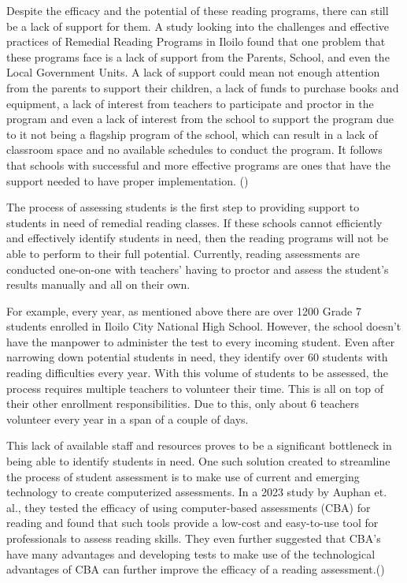 Despite the efficacy and the potential of these reading programs, there can still be a lack of support for them. A study looking into the challenges and effective practices of Remedial Reading Programs in Iloilo found that one problem that these programs face is a lack of support from the Parents, School, and even the Local Government Units. A lack of support could mean not enough attention from the parents to support their children, a lack of funds to purchase books and equipment, a lack of interest from teachers to participate and proctor in the program and even a lack of interest from the school to support the program due to it not being a flagship program of the school, which can result in a lack of classroom space and no available schedules to conduct the program. It follows that schools with successful and more effective programs are ones that have the support needed to have proper implementation. (\cite{Sancada_2022})

The process of assessing students is the first step to providing support to students in need of remedial reading classes. If these schools cannot efficiently and effectively identify students in need, then the reading programs will not be able to perform to their full potential. Currently, reading assessments are conducted one-on-one with teachers’ having to proctor and assess the student’s results manually and all on their own.

For example, every year, as mentioned above there are over 1200 Grade 7 students enrolled in Iloilo City National High School. However, the school doesn’t have the manpower to administer the test to every incoming student. Even after narrowing down potential students in need, they identify over 60 students with reading difficulties every year. With this volume of students to be assessed, the process requires multiple teachers to volunteer their time. This is all on top of their other enrollment responsibilities. Due to this, only about 6 teachers volunteer every year in a span of a couple of days.

This lack of available staff and resources proves to be a significant bottleneck in being able to identify students in need. One such solution created to streamline the process of student assessment is to make use of current and emerging technology to create computerized assessments. In a 2023 study by Auphan et. al., they tested the efficacy of using computer-based assessments (CBA) for reading and found that such tools provide a low-cost and easy-to-use tool for professionals to assess reading skills. They even further suggested that CBA’s have many advantages and developing tests to make use of the technological advantages of CBA can further improve the efficacy of a reading assessment.(\cite{Auphan_Ecalle_Magnan_2020})

